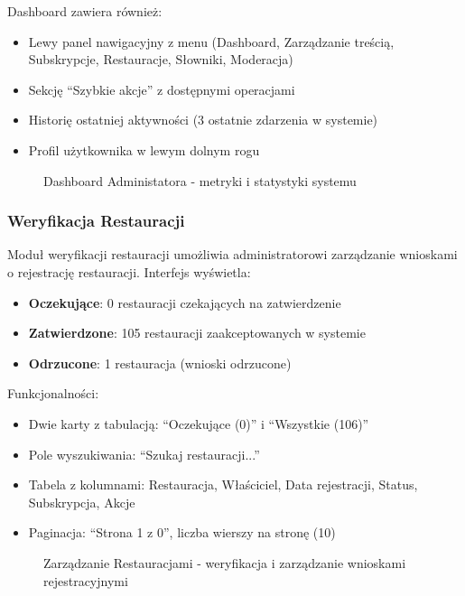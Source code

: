 \documentclass[12pt,a4paper,utf-8]{article}
\begin{document}
Dashboard zawiera również:
\begin{itemize}
    \item Lewy panel nawigacyjny z menu (Dashboard, Zarządzanie treścią, Subskrypcje, Restauracje, Słowniki, Moderacja)
    \item Sekcję ``Szybkie akcje'' z dostępnymi operacjami
    \item Historię ostatniej aktywności (3 ostatnie zdarzenia w systemie)
    \item Profil użytkownika w lewym dolnym rogu
\end{itemize}

\begin{figure}[H]
    \centering
    \caption{Dashboard Administatora  -  metryki i statystyki systemu}
    \label{fig:admin_dashboard}
\end{figure}

\subsubsection{Weryfikacja Restauracji}

Moduł weryfikacji restauracji umożliwia administratorowi zarządzanie wnioskami o rejestrację restauracji. Interfejs wyświetla:

\begin{itemize}
    \item \textbf{Oczekujące}: 0 restauracji czekających na zatwierdzenie
    \item \textbf{Zatwierdzone}: 105 restauracji zaakceptowanych w systemie
    \item \textbf{Odrzucone}: 1 restauracja (wnioski odrzucone)
\end{itemize}

Funkcjonalności:
\begin{itemize}
    \item Dwie karty z tabulacją: ``Oczekujące (0)'' i ``Wszystkie (106)''
    \item Pole wyszukiwania: ``Szukaj restauracji...''
    \item Tabela z kolumnami: Restauracja, Właściciel, Data rejestracji, Status, Subskrypcja, Akcje
    \item Paginacja: ``Strona 1 z 0'', liczba wierszy na stronę (10)
\end{itemize}

\begin{figure}[H]
    \centering
    \caption{Zarządzanie Restauracjami  -  weryfikacja i zarządzanie wnioskami rejestracyjnymi}
    \label{fig:restaurants_verification}
\end{figure}
\end{document}

